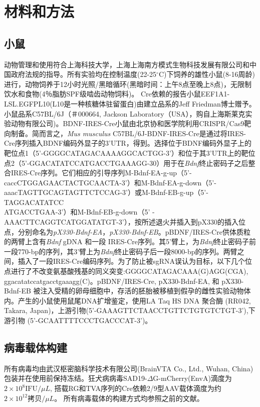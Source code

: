\chapter{材料和方法}

\section{小鼠}
动物管理和使用符合上海科技大学，上海上海南方模式生物科技发展有限公司和中国政府法规的指导。所有实验均在控制温度(22-25$^\circ$C)下饲养的雄性小鼠(8-16周龄)进行，动物饲养于12小时光照/黑暗循环(黑暗时间：上午8点至晚上8点)，无限制饮水和食物(4％脂肪SPF级啮齿动物饲料)。
Cre依赖的报告小鼠EEF1A1-LSL.EGFPL10(L10是一种核糖体驻留蛋白)\citep{stanley2013profiling}由建立品系的Jeff Friedman博士赠予。小鼠品系C57BL/6J（＃000664, Jackson Laboratory（USA），购自上海斯莱克实验动物有限公司)。BDNF-IRES-Cre小鼠由北京协和医学院利用CRISPR/Cas9靶向制备。简而言之，\textit{Mus musculus} C57BL/6J-BDNF-IRES-Cre是通过将IRES-Cre序列插入BDNF编码外显子的3'UTR，得到。选择位于BDNF编码外显子上的靶位点1（5'-GGGGCATAGACAAAAGGCACTGG-3'）和位于其3'UTR上的靶位点2（5'-GGACATATCCATGACCTGAAAGG-30）用于在\textit{Bdnf}终止密码子之后整合IRES-Cre序列。它们相应的引导序列M-Bdnf-EA-g-up（5'-caccCTGGAGAACTACTGCAACTA-3'）和M-Bdnf-EA-g-down（5'-aaacTAGTTGCAGTAGTTCTCCAG-3'）或M-Bdnf-EB-g-up（5'-TAGGACATATCC\\ATGACCTGAA-3'）和M-Bdnf-EB-g-down（5' -AAACTTCAGGTCATGGATATGT-3'），按\citep{mizuno2014simple}所述退火并插入到pX330的插入位点，分别命名为\textit{pX330-Bdnf-EA}，\textit{pX330-Bdnf-EB}。pBDNF/IRES-Cre供体质粒的两臂上含有\textit{Bdnf} gDNA 和一段 IRES-Cre序列。其5'臂上，为\textit{Bdnf}终止密码子前一段770-bp的序列，其3'臂上为\textit{Bdnf}终止密码子后一段8000-bp的序列。两臂之间，插入了一段IRES-Cre编码序列。为了防止被sgRNA误认为目标，以下几个位点进行了不改变氨基酸残基的同义突变:GGGGCATAGACAAA(G)AGG(CGA), ggacatatccatgacctgaaagg(C)。pBDNF/IRES-Cre, pX330-Bdnf-EA, 和 pX330-Bdnf-EB 被注入受精的卵母细胞中，存活的胚胎被移植到假孕的雌性实验动物体内。产生的小鼠使用鼠尾DNA扩增鉴定，使用LA Taq HS DNA 聚合酶 (RR042, Takara, Japan)，上游引物(5'-GAAAGTTCTAACCTGTTCTGTGTCTGT-3'),下游引物 (5'-GCAATTTTCCCTGACCCAT-3')。

\section{病毒载体构建}
所有病毒均由武汉枢密脑科学技术有限公司(BrainVTA Co., Ltd., Wuhan, China)包装并在使用前保持冻结。狂犬病病毒SAD19-$\Delta$G-mCherry(EnvA)滴度为$2 \times 10^8 \text{IFU}/\mu L$, 搭载RG和TVA序列的Cre依赖2/9型AAV载体滴度为约$2 \times 10^12 \text{拷贝}/\mu L$。 所有病毒载体的构建方式均参照之前的文献\citep{zhang2017whole}。

